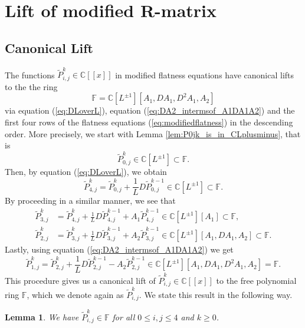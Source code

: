 \documentclass[12pt]{amsart}
\newtheorem{lem}[prop]{Lemma}
\numberwithin{equation}{section}
\begin{document}
\section{Lift of modified R-matrix}\label{sec:lifts}
\subsection{Canonical Lift}
The functions $\widetilde{P}_{i,j}^k\in\mathbb{C}[[x]]$ in modified flatness equations have canonical lifts to the the ring  $$\mathbb{F}=\mathbb{C}[L^{\pm 1}][A_1,DA_1,D^2A_1,A_2]$$ 
via equation (\ref{eq:DLoverL}), equation (\ref{eq:DA2_intermsof_A1DA1A2}) and the first four rows of the flatness equations (\ref{eq:modifiedflatness}) in the descending order. More precisely, we start with Lemma \ref{lem:P0jk_is_in_CLplusminus}, that is
\begin{equation*}
\widetilde{P}_{0,j}^k\in\mathbb{C}[L^{\pm 1}]\subset\mathbb{F}.
\end{equation*}
Then, by equation (\ref{eq:DLoverL}), we obtain
\begin{equation*}
\widetilde{P}_{4,j}^k=\widetilde{P}_{0,j}^k+\frac{1}{L}D\widetilde{P}_{0,j}^{k-1}\in\mathbb{C}[L^{\pm 1}]\subset\mathbb{F}.
\end{equation*}
By proceeding in a similar manner, we see that
\begin{equation*}
\begin{aligned}
\widetilde{P}_{3,j}^k&=\widetilde{P}_{4,j}^k+\frac{1}{L}D\widetilde{P}_{4,j}^{k-1}+A_1\widetilde{P}_{4,j}^{k-1}\in\mathbb{C}[L^{\pm 1}][A_1]\subset\mathbb{F},\\
\widetilde{P}_{2,j}^k&=\widetilde{P}_{3,j}^k+\frac{1}{L}D\widetilde{P}_{3,j}^{k-1}+A_2\widetilde{P}_{3,j}^{k-1}\in\mathbb{C}[L^{\pm 1}][A_1,DA_1,A_2]\subset\mathbb{F}.
\end{aligned}
\end{equation*}
Lastly, using equation (\ref{eq:DA2_intermsof_A1DA1A2}) we get
\begin{equation*}
\widetilde{P}_{1,j}^k=\widetilde{P}_{2,j}^k+\frac{1}{L}D\widetilde{P}_{2,j}^{k-1}-A_2\widetilde{P}_{2,j}^{k-1}\in\mathbb{C}[L^{\pm 1}][A_1,DA_1,D^2A_1,A_2]=\mathbb{F}.
\end{equation*}
This procedure gives us a canonical lift of $\widetilde{P}_{i,j}^k\in\mathbb{C}[[x]]$ to the free polynomial ring $\mathbb{F}$, which we denote again as $\widetilde{P}_{i,j}^k$. We state this result in the following way.

\begin{lem}\label{lem:lifting_lemma}
We have $\widetilde{P}_{i,j}^k\in\mathbb{F}$ for all $0\leq{i,j}\leq{4}$ and $k\geq{0}$.
\end{lem}
\end{document}
